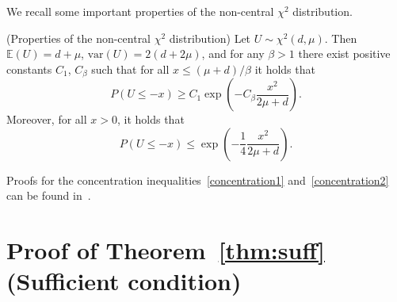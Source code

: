\begin{subappendices}
We recall some important properties of the non-central $\chi^2$ distribution.
\begin{property}{(Properties of the non-central $\chi^2$ distribution)}
\label{ppty:ncchi^2}
Let $U\sim \chi^2(d,\mu)$. Then $\mathbb{E}(U)=d+\mu$, $\text{var}(U) = 2(d+2\mu)$, and for any $\beta>1$ there exist positive constants $C_1$, $C_{\beta}$ such that for all $x\leq (\mu+d)/\beta$ it holds that 
\begin{equation}
\label{concentration1}
P\left(U\leq -x\right) \geq C_1 \exp{\left(-C_\beta \frac{x^2}{2\mu+d}\right)}.
\end{equation}
Moreover, for all $x>0$, it holds that 
\begin{equation}
    \label{concentration2}
P\left(U\leq -x\right) \leq \exp{\left(-\frac14 \frac{x^2}{2\mu+d}\right)}.
\end{equation}
\end{property}
Proofs for the concentration inequalities~\ref{concentration1} and~\ref{concentration2} can be found in~\cite[Theorem~7]{chi2magical}. 
\section{Proof of Theorem~\ref{thm:suff} (Sufficient condition)}
\label{sec:suff}
\begin{prv*}


\end{prv*}
\end{subappendices}
